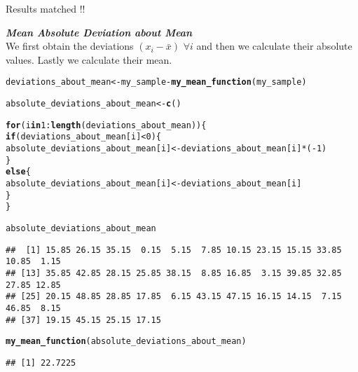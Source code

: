 \documentclass[11pt, a4paper]{article}\usepackage[]{graphicx}\usepackage[]{xcolor}
\makeatletter
\newcommand{\hlnum}[1]{\textcolor[rgb]{0.686,0.059,0.569}{#1}}%
\newcommand{\hlopt}[1]{\textcolor[rgb]{0,0,0}{#1}}%
\newcommand{\hldef}[1]{\textcolor[rgb]{0.345,0.345,0.345}{#1}}%
\newcommand{\hlkwa}[1]{\textcolor[rgb]{0.161,0.373,0.58}{\textbf{#1}}}%
\newcommand{\hlkwb}[1]{\textcolor[rgb]{0.69,0.353,0.396}{#1}}%
\newcommand{\hlkwd}[1]{\textcolor[rgb]{0.737,0.353,0.396}{\textbf{#1}}}%
\newenvironment{kframe}{%
 \def\at@end@of@kframe{}%
 \ifinner\ifhmode%
  \def\at@end@of@kframe{\end{minipage}}%
  \begin{minipage}{\columnwidth}%
 \fi\fi%
 \def\FrameCommand##1{\hskip\@totalleftmargin \hskip-\fboxsep
 \colorbox{shadecolor}{##1}\hskip-\fboxsep
     \hskip-\linewidth \hskip-\@totalleftmargin \hskip\columnwidth}%
 \MakeFramed {\advance\hsize-\width
   \@totalleftmargin\z@ \linewidth\hsize
   \@setminipage}}%
 {\par\unskip\endMakeFramed%
 \at@end@of@kframe}
\newenvironment{knitrout}{}{} %
\makeatother
\begin{document}
\faCheckCircle[regular] Results matched !! \\

\newpage

\faArrowAltCircleRight[regular] \textit{\textbf{Mean Absolute Deviation about Mean}} \\

We first obtain the deviations $(x_i - \bar{x}) \,\, \forall i$ and then we calculate their absolute values. Lastly we calculate their mean.

\begin{knitrout}\footnotesize
{}\color{fgcolor}\begin{kframe}
\begin{alltt}
\hldef{deviations_about_mean} \hlkwb{<-} \hldef{my_sample} \hlopt{-} \hlkwd{my_mean_function}\hldef{(my_sample)}

\hldef{absolute_deviations_about_mean} \hlkwb{<-} \hlkwd{c}\hldef{()}

\hlkwa{for} \hldef{(i} \hlkwa{in} \hlnum{1}\hlopt{:}\hlkwd{length}\hldef{(deviations_about_mean)) \{}
  \hlkwa{if}\hldef{(deviations_about_mean[i]} \hlopt{<} \hlnum{0}\hldef{)\{}
    \hldef{absolute_deviations_about_mean[i]} \hlkwb{<-} \hldef{deviations_about_mean[i]} \hlopt{*} \hldef{(}\hlopt{-}\hlnum{1}\hldef{)}
  \hldef{\}}
  \hlkwa{else}\hldef{\{}
    \hldef{absolute_deviations_about_mean[i]} \hlkwb{<-} \hldef{deviations_about_mean[i]}
  \hldef{\}}
\hldef{\}}
\end{alltt}
\end{kframe}
\end{knitrout}

\begin{knitrout}\footnotesize
{}\color{fgcolor}\begin{kframe}
\begin{alltt}
\hldef{absolute_deviations_about_mean}
\end{alltt}
\begin{verbatim}
##  [1] 15.85 26.15 35.15  0.15  5.15  7.85 10.15 23.15 15.15 33.85 10.85  1.15
## [13] 35.85 42.85 28.15 25.85 38.15  8.85 16.85  3.15 39.85 32.85 27.85 12.85
## [25] 20.15 48.85 28.85 17.85  6.15 43.15 47.15 16.15 14.15  7.15 46.85  8.15
## [37] 19.15 45.15 25.15 17.15
\end{verbatim}
\end{kframe}
\end{knitrout}

\begin{knitrout}\footnotesize
{}\color{fgcolor}\begin{kframe}
\begin{alltt}
\hlkwd{my_mean_function}\hldef{(absolute_deviations_about_mean)}
\end{alltt}
\begin{verbatim}
## [1] 22.7225
\end{verbatim}
\end{kframe}
\end{knitrout}
\end{document}
